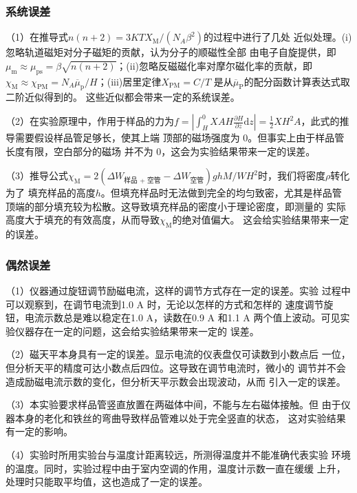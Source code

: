 \documentclass[12pt]{ctexart}
\numberwithin{equation}{section}
\begin{document}
\subsubsection{系统误差}

（1）在推导式$n(n+2) = 3KTX_\text{M}/(N_A\beta^2)$的过程中进行了几处
近似处理。(i)忽略轨道磁矩对分子磁矩的贡献，认为分子的顺磁性全部
由电子自旋提供，即$\mu_\text{m} \approx \mu_\text{ps} = \beta
\sqrt{n(n+2)}$；(ii)忽略反磁磁化率对摩尔磁化率的贡献，即
$\chi_\text{M} \approx \chi_\text{PM} = N_A
\overline{\mu}_\text{p}/H$；(iii)居里定律$X_\text{PM} = C/T$
是从$\overline{\mu}_\text{P}$的配分函数计算表达式取二阶近似得到的。
这些近似都会带来一定的系统误差。

（2）在实验原理中，作用于样品的力为$f = \displaystyle{\left|
\int_H^0 XAH\frac{\partial H}{\partial z}\mathrm{d}z\right|
= \frac{1}{2}XH^2A}$，此式的推导需要假设样品管足够长，使其上端
顶部的磁场强度为 0。但事实上由于样品管长度有限，空白部分的磁场
并不为 0，这会为实验结果带来一定的误差。

（3）推导公式$\chi_\text{M} = 2(\Delta W_{\text{样品 + 空管}}
- \Delta W_{\text{空管}})ghM/WH^2$时，我们将密度$\rho$转化为了
填充样品的高度$h$。但填充样品时无法做到完全的均匀致密，尤其是样品管
顶端的部分填充较为松散。这导致填充样品的密度小于理论密度，即测量的
实际高度大于填充的有效高度，从而导致$\chi_\text{M}$的绝对值偏大。
这会给实验结果带来一定的误差。

\subsubsection{偶然误差}

（1）仪器通过旋钮调节励磁电流，这样的调节方式存在一定的误差。实验
过程中可以观察到，在调节电流到1.0 A 时，无论以怎样的方式和怎样的
速度调节旋钮，电流示数总是难以稳定在1.0 A，读数在0.9 A 和1.1 A
两个值上波动。可见实验仪器存在一定的问题，这会给实验结果带来一定的
误差。

（2）磁天平本身具有一定的误差。显示电流的仪表盘仅可读数到小数点后
一位，但分析天平的精度可达小数点后四位。这导致在调节电流时，微小的
调节并不会造成励磁电流示数的变化，但分析天平示数会出现波动，从而
引入一定的误差。

（3）本实验要求样品管竖直放置在两磁体中间，不能与左右磁体接触。但
由于仪器本身的老化和铁丝的弯曲导致样品管难以处于完全竖直的状态，
这对实验结果有一定的影响。

（4）实验时所用实验台与温度计距离较远，所测得温度并不能准确代表实验
环境的温度。同时，实验过程中由于室内空调的作用，温度计示数一直在缓缓
上升，处理时只能取平均值，这也造成了一定的误差。
\end{document}
